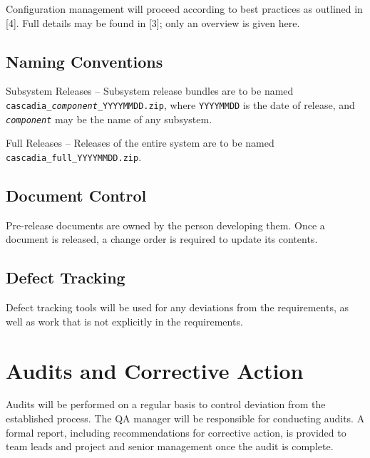 \documentclass[11pt]{wacomepd}
\begin{document}
Configuration management will proceed according to best practices as outlined in [4].  Full details
may be found in [3]; only an overview is given here.

\section{Naming Conventions}
{\sc Subsystem Releases} -- Subsystem release bundles are to be named
{\tt cascadia\_\textit{component}\_YYYYMMDD.zip}, where {\tt YYYYMMDD} is the date of release,
and {\tt \textit{component}} may be the name of any subsystem.

{\sc Full Releases} -- Releases of the entire system are to be named
\texttt{cascadia\_full\_YYYYMMDD.zip}.


\section{Document Control}
Pre-release documents are owned by the person developing them.  Once a document is released, a
change order is required to update its contents.


\section{Defect Tracking}
Defect tracking tools will be used for any deviations from the requirements, as well as work that is
not explicitly in the requirements.


\chapter{Audits and Corrective Action}

Audits will be performed on a regular basis to control deviation from the established process.  The
QA manager will be responsible for conducting audits.  A formal report, including recommendations
for corrective action, is provided to team leads and project and senior management once the audit is
complete.
\end{document}
